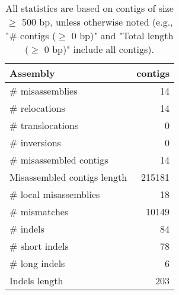 \documentclass[12pt,a4paper]{article}
\begin{document}
\begin{table}[ht]
\begin{center}
\caption{All statistics are based on contigs of size $\geq$ 500 bp, unless otherwise noted (e.g., "\# contigs ($\geq$ 0 bp)" and "Total length ($\geq$ 0 bp)" include all contigs).}
\begin{tabular}{|l*{1}{|r}|}
\hline
Assembly & contigs \\ \hline
\# misassemblies & 14 \\ \hline
\hspace{5mm}\# relocations & 14 \\ \hline
\hspace{5mm}\# translocations & 0 \\ \hline
\hspace{5mm}\# inversions & 0 \\ \hline
\# misassembled contigs & 14 \\ \hline
Misassembled contigs length & 215181 \\ \hline
\# local misassemblies & 18 \\ \hline
\# mismatches & 10149 \\ \hline
\# indels & 84 \\ \hline
\hspace{5mm}\# short indels & 78 \\ \hline
\hspace{5mm}\# long indels & 6 \\ \hline
Indels length & 203 \\ \hline
\end{tabular}
\end{center}
\end{table}
\end{document}
